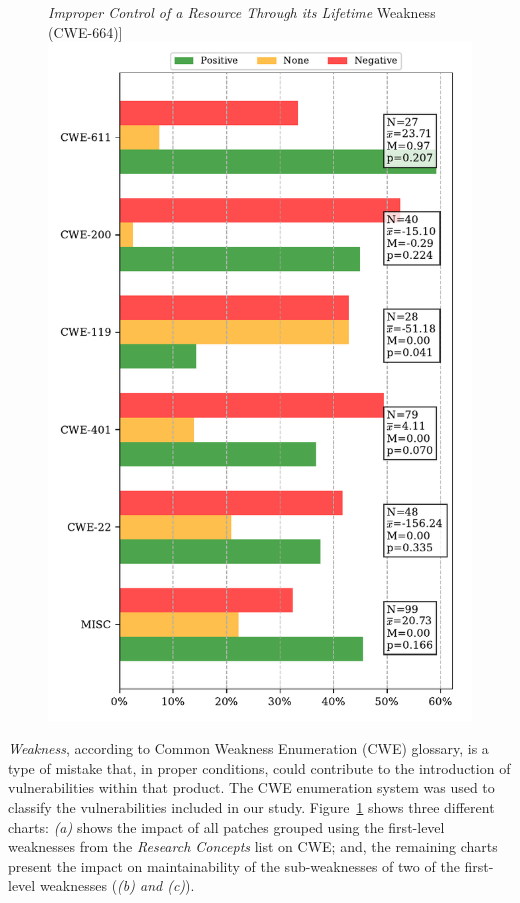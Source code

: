 \documentclass[10pt,conference]{IEEEtran}
\begin{document}
\begin{figure}[htp]
	\textit{Improper Control of a Resource Through its Lifetime} Weakness (CWE-664)]{\includegraphics[scale=0.4]{figures/main_per_cwe_spec_664.pdf}}
	\label{fig:pat}
\end{figure}

\emph{Weakness}, according to Common Weakness Enumeration (CWE) glossary, 
is a type of mistake that, in proper conditions, could contribute to the 
introduction of vulnerabilities within that product. The CWE enumeration
system was used to classify the vulnerabilities included in our study.
Figure~\ref{fig:pat} shows three different charts: \emph{(a)} shows
the impact of all patches grouped using the first-level weaknesses from
the \emph{Research Concepts} list on CWE; and, the remaining charts
present the impact on maintainability of the sub-weaknesses of two of
the first-level weaknesses (\emph{(b) and (c)}). 
\end{document}
